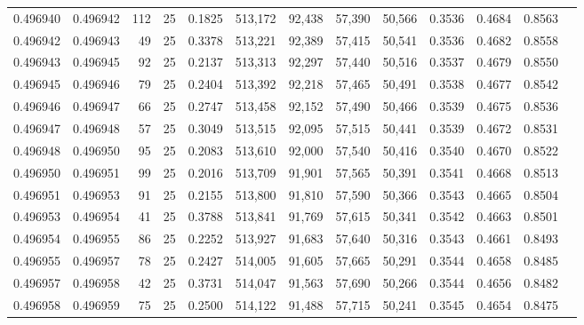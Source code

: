 \begin{tabular}{rrrrrrrrrrrrr}
0.496940 & 0.496942 &   112 &  25 &                                     0.1825 & 513,172 &  92,438 &  57,390 &  50,566 & 0.3536 & 0.4684 & 0.8563 \\
0.496942 & 0.496943 &    49 &  25 &                                     0.3378 & 513,221 &  92,389 &  57,415 &  50,541 & 0.3536 & 0.4682 & 0.8558 \\
0.496943 & 0.496945 &    92 &  25 &                                     0.2137 & 513,313 &  92,297 &  57,440 &  50,516 & 0.3537 & 0.4679 & 0.8550 \\
0.496945 & 0.496946 &    79 &  25 &                                     0.2404 & 513,392 &  92,218 &  57,465 &  50,491 & 0.3538 & 0.4677 & 0.8542 \\
0.496946 & 0.496947 &    66 &  25 &                                     0.2747 & 513,458 &  92,152 &  57,490 &  50,466 & 0.3539 & 0.4675 & 0.8536 \\
0.496947 & 0.496948 &    57 &  25 &                                     0.3049 & 513,515 &  92,095 &  57,515 &  50,441 & 0.3539 & 0.4672 & 0.8531 \\
0.496948 & 0.496950 &    95 &  25 &                                     0.2083 & 513,610 &  92,000 &  57,540 &  50,416 & 0.3540 & 0.4670 & 0.8522 \\
0.496950 & 0.496951 &    99 &  25 &                                     0.2016 & 513,709 &  91,901 &  57,565 &  50,391 & 0.3541 & 0.4668 & 0.8513 \\
0.496951 & 0.496953 &    91 &  25 &                                     0.2155 & 513,800 &  91,810 &  57,590 &  50,366 & 0.3543 & 0.4665 & 0.8504 \\
0.496953 & 0.496954 &    41 &  25 &                                     0.3788 & 513,841 &  91,769 &  57,615 &  50,341 & 0.3542 & 0.4663 & 0.8501 \\
0.496954 & 0.496955 &    86 &  25 &                                     0.2252 & 513,927 &  91,683 &  57,640 &  50,316 & 0.3543 & 0.4661 & 0.8493 \\
0.496955 & 0.496957 &    78 &  25 &                                     0.2427 & 514,005 &  91,605 &  57,665 &  50,291 & 0.3544 & 0.4658 & 0.8485 \\
0.496957 & 0.496958 &    42 &  25 &                                     0.3731 & 514,047 &  91,563 &  57,690 &  50,266 & 0.3544 & 0.4656 & 0.8482 \\
0.496958 & 0.496959 &    75 &  25 &                                     0.2500 & 514,122 &  91,488 &  57,715 &  50,241 & 0.3545 & 0.4654 & 0.8475 \\

\end{tabular}
